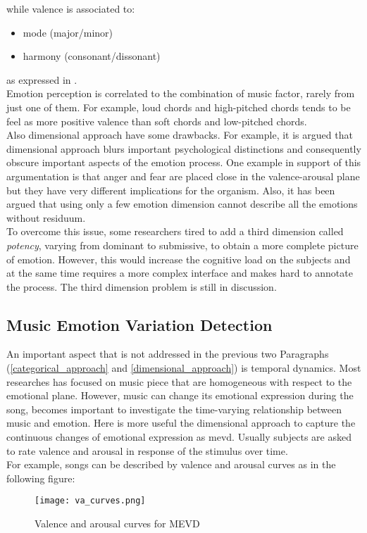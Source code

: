 while valence is associated to:
\begin{itemize}
	\item mode (major/minor)
	\item harmony (consonant/dissonant)
\end{itemize}
as expressed in \cite{gabrielsson2001influence}.
\\
Emotion perception is correlated to the combination of music factor, rarely from just one of them. For example, loud chords and high-pitched chords tends to be feel as more positive valence than soft chords and low-pitched chords.
\\ \indent
Also dimensional approach have some drawbacks. For example, it is argued that dimensional approach blurs important psychological distinctions and consequently obscure important aspects of the emotion process. One example in support of this argumentation is that anger and fear are placed close in the valence-arousal plane but they have very different implications for the organism. Also, it has been argued that using only a few emotion dimension cannot describe all the emotions without residuum.
\\
To overcome this issue, some researchers tired to add a third dimension called \textit{potency}, varying from dominant to submissive, to obtain a more complete picture of emotion. However, this would increase the cognitive load on the subjects and at the same time requires a more complex interface and makes hard to annotate the process. The third dimension problem is still in discussion.

\subsection{Music Emotion Variation Detection}
An important aspect that is not addressed in the previous two Paragraphs (\ref{categorical_approach} and \ref{dimensional_approach}) is temporal dynamics. Most researches has focused on music piece that are homogeneous with respect to the emotional plane. However, music can change its emotional expression during the song, becomes important to investigate the time-varying relationship between music and emotion. Here is more useful the dimensional approach to capture the continuous changes of emotional expression as \gls{mevd}. Usually subjects are asked to rate valence and arousal in response of the stimulus over time.
\\
For example, songs can be described by valence and arousal curves as in the following figure:
\begin{figure}[h]
    \centering
    \texttt{[image: va\_curves.png]} 
	\caption{Valence and arousal curves for MEVD}
    \label{fig:va_curves}
\end{figure}

